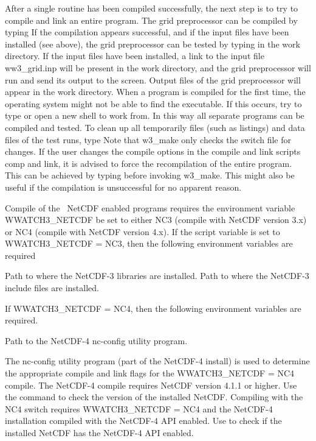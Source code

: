 After a single routine has been compiled successfully, the next step is to try
to compile and link an entire program. The grid preprocessor can be compiled
by typing  If the compilation appears successful,
and if the input files have been installed (see above), the grid preprocessor
can be tested by typing  in the work directory. If the
input files have been installed, a link to the input file {\file
ww3\_grid.inp} will be present in the work directory, and the grid
preprocessor will run and send its output to the screen. Output files of the
grid preprocessor will appear in the work directory. When a program is
compiled for the first time, the operating system might not be able to find
the executable. If this occurs, try to type  or open a new
shell to work from. In this way all separate programs can be compiled and
tested. To clean up all temporarily files (such as listings) and data files of
the test runs, type  Note that {\file w3\_make} only checks
the switch file for changes. If the user changes the compile options in the
compile and link scripts {\file comp} and {\file link}, it is advised to force
the recompilation of the entire program. This can be achieved by typing
 before invoking {\file w3\_make}. This
might also be useful if the compilation is unsuccessful for no apparent
reason.


\vspace{\baselineskip} 
\noindent
Compile of the \ws\ NetCDF enabled programs requires the environment variable
{\code WWATCH3\_NETCDF} be set to either {\code NC3} (compile with NetCDF
version 3.x) or {\code NC4} (compile with NetCDF version 4.x).  If the script
variable is set to {\code WWATCH3\_NETCDF = NC3}, then the following
environment variables are required
\begin{clist}
 {Path to where the NetCDF-3 libraries are installed.}
 {Path to where the NetCDF-3 include files are installed.}
\end{clist}
If {\code WWATCH3\_NETCDF = NC4}, then the following environment variables
are required.
\begin{clist}
 {Path to the NetCDF-4 nc-config utility program.}
\end{clist}
The {\file nc-config} utility program (part of the NetCDF-4 install) is used
to determine the appropriate compile and link flags for the {\code
  WWATCH3\_NETCDF = NC4} compile.  The NetCDF-4 compile requires NetCDF
version 4.1.1 or higher.  Use the command 
to check the version of the installed NetCDF.  Compiling with the {\code NC4}
switch requires {\code WWATCH3\_NETCDF = NC4} and the NetCDF-4 installation
compiled with the NetCDF-4 API enabled.  Use  to check if the installed NetCDF has the NetCDF-4 API enabled.

